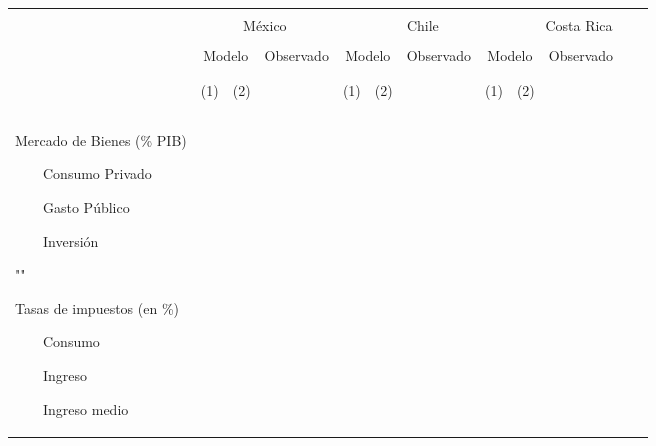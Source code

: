 \documentclass[10pt,a4paper]{report}
\newcommand{\tabitem}{~~\llap{\textbullet}~~}
\begin{document}
\begin{landscape}

\begin{longtable}{p{5cm} p{1cm} p{1cm} p{1cm} p{1cm} p{1cm} p{1cm} p{1cm} p{1cm} p{1cm} p{1cm} p{1cm}}  
\\[-1.8ex]\hline 
\endhead
\hline \\[-1.8ex] 
\multicolumn{1}{c}{} & \multicolumn{3}{c}{México} & \multicolumn{4}{c}{Chile} &   \multicolumn{4}{c}{Costa Rica} \\
\\ 
\multicolumn{1}{c}{} & \multicolumn{2}{c}{Modelo}  & \multicolumn{1}{c}{Observado}  & \multicolumn{2}{c}{Modelo} & \multicolumn{1}{c}{Observado} & \multicolumn{2}{c}{Modelo} & \multicolumn{1}{c}{Observado}\\
\\
\cline{2-3}
\cline{5-6}
\cline{8-9}

\\ 
\multicolumn{1}{c}{} & \multicolumn{1}{c}{\small (1)} & \multicolumn{1}{c}{\small (2)}  & \multicolumn{1}{c}{}  & \multicolumn{1}{c}{\small (1)} & \multicolumn{1}{c}{\small (2)} & \multicolumn{1}{c}{} & \multicolumn{1}{c}{\small (1)} & \multicolumn{1}{c}{\small (2)} & \multicolumn{1}{c}{}\\

\\
\hline \\[-1ex] 


Mercado de Bienes (\% PIB)

\par\tabitem Consumo Privado

\par\tabitem Gasto Público

\par\tabitem Inversión

\par ""

Tasas de impuestos (en \%) 

\par\tabitem Consumo 

\par\tabitem Ingreso

\par\tabitem Ingreso medio


\end{longtable}
\end{landscape}
\end{document}
